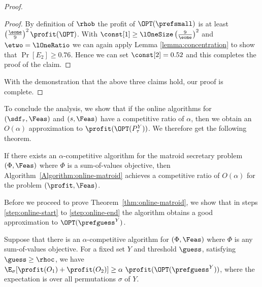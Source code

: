 \begin{proof}
\begin{proof}
By definition of $\rhob$ the profit of $\OPT(\prefsmall)$ is at least
$\left(\frac{\eone}{9}\right)^2 \profit(\OPT)$. With $\const[1] \geq
\lOneSize \left( \frac{9}{\eone}\right)^2 $ and $\etwo = \lOneRatio$ we can again
apply Lemma \ref{lemma:concentration} to show that $\Pr[ E_2]
\ge0.76$. Hence we can set $\const[2] = 0.52$ and this completes the proof
of the claim.
\end{proof}

With the demonstration that the above three claims hold, our proof is complete.
\end{proof}

To conclude the analysis, we show that if the online algorithms for
$(\sdf_\tau,\Feas)$ and $(s,\Feas)$ have a
competitive ratio of $\alpha$, then we obtain an $O(\alpha)$
approximation to $\profit(\OPT(P^Y_\tau))$. We therefore get the
following theorem.

\begin{theorem}
\label{thm:online-matroid}
If there exists an $\alpha$-competitive algorithm for the matroid
secretary problem $(\Phi, \Feas)$ where $\Phi$ is a sum-of-values objective,
then Algorithm~\ref{Algorithm:online-matroid} achieves a competitive ratio of
$O(\alpha)$ for the problem $(\profit, \Feas)$.
\end{theorem}

Before we proceed to prove Theorem~\ref{thm:online-matroid}, we show
that in steps \ref{step:online-start} to \ref{step:online-end} the
algorithm obtains a good approximation to $\OPT(\prefguess^Y)$.

\begin{lemma}
  \label{lem:secondstage}
Suppose that there is an $\alpha$-competitive algorithm for
$(\Phi,\Feas)$ where $\Phi$ is any sum-of-values objective. For a fixed set
$Y$ and threshold $\guess$, satisfying $\guess \geq \rhoc$, we have $
\E_\sigma[\profit(O_1) + \profit(O_2)] \geq \alpha
\ \profit(\OPT(\prefguess^Y))$, where the expectation is over all
permutations $\sigma$ of $Y$.
\end{lemma}

